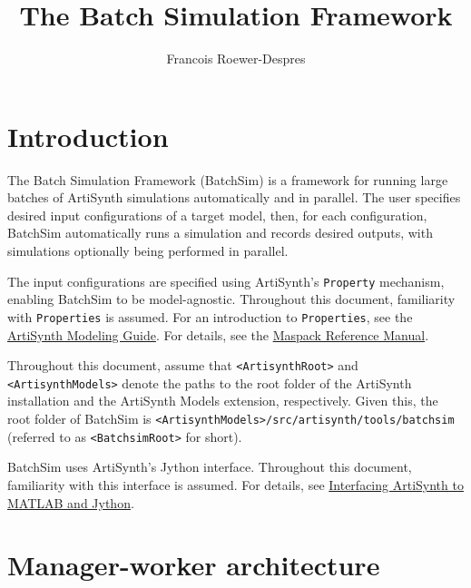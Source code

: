 \documentclass{article}
\newcommand{\AS}{<ArtisynthRoot>}
\newcommand{\AM}{<ArtisynthModels>}
\newcommand{\BS}{<BatchsimRoot>}
\begin{document}
\setcounter{tocdepth}{5}
\setcounter{secnumdepth}{3}

\title{The Batch Simulation Framework}
\author{Francois Roewer-Despres}

\iflatexml
\date{}
\fi

\maketitle

\iflatexml{\large\pubdate}\fi

\tableofcontents


\section{Introduction}

The Batch Simulation Framework (BatchSim) is a framework for running large batches of ArtiSynth simulations automatically and in parallel. The user specifies desired input configurations of a target model, then, for each configuration, BatchSim automatically runs a simulation and records desired outputs, with simulations optionally being performed in parallel.

The input configurations are specified using ArtiSynth's {\tt Property} mechanism, enabling BatchSim to be model-agnostic. Throughout this document, familiarity with {\tt Properties} is assumed. For an introduction to {\tt Properties}, see the \href{https://www.artisynth.org/Documentation/ModelingGuide}{ArtiSynth Modeling Guide}. For details, see the \href{https://www.artisynth.org/Documentation/MaspackRefManual}{Maspack Reference Manual}.

Throughout this document, assume that {\tt \AS} and {\tt \AM} denote the paths to the root folder of the ArtiSynth installation and the ArtiSynth Models extension, respectively. Given this, the root folder of BatchSim is {\tt \AM/src/artisynth/tools/batchsim} (referred to as {\tt \BS} for short).

BatchSim uses ArtiSynth's Jython interface. Throughout this document, familiarity with this interface is assumed. For details, see \href{https://www.artisynth.org/Documentation/MatlabAndJython}{Interfacing ArtiSynth to MATLAB and Jython}.

\section{Manager-worker architecture}
\end{document}
